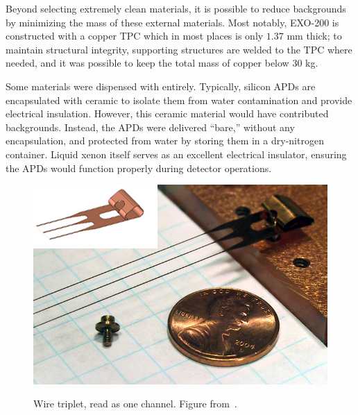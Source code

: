 Beyond selecting extremely clean materials, it is possible to reduce backgrounds by minimizing the mass of these external materials.  Most notably, EXO-200 is constructed with a copper TPC which in most places is only $1.37$ mm thick; to maintain structural integrity, supporting structures are welded to the TPC where needed, and it was possible to keep the total mass of copper below $30$ kg.~\cite{detectorPartI}

Some materials were dispensed with entirely.  Typically, silicon APDs are encapsulated with ceramic to isolate them from water contamination and provide electrical insulation.  However, this ceramic material would have contributed backgrounds.  Instead, the APDs were delivered ``bare,'' without any encapsulation, and protected from water by storing them in a dry-nitrogen container.  Liquid xenon itself serves as an excellent electrical insulator, ensuring the APDs would function properly during detector operations.~\cite{EXOLAAPD}

\begin{figure}
\begin{center}
\includegraphics[keepaspectratio=true,width=\textwidth]{triplet.jpg}
\end{center}
\renewcommand{\baselinestretch}{1}
\small\normalsize
\begin{quote}
\caption{Wire triplet, read as one channel.  Figure from~\cite{detectorPartI}.}
\label{fig:WireTriplet}
\end{quote}
\end{figure}
\renewcommand{\baselinestretch}{2}
\small\normalsize

